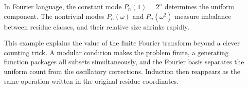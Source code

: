In Fourier language, the constant mode \(P_n(1)=2^n\) determines the uniform component. The nontrivial modes \(P_n(\omega)\) and \(P_n(\omega^2)\) measure imbalance between residue classes, and their relative size shrinks rapidly.

This example explains the value of the finite Fourier transform beyond a clever counting trick. A modular condition makes the problem finite, a generating function packages all subsets simultaneously, and the Fourier basis separates the uniform count from the oscillatory corrections. Induction then reappears as the same operation written in the original residue coordinates.

